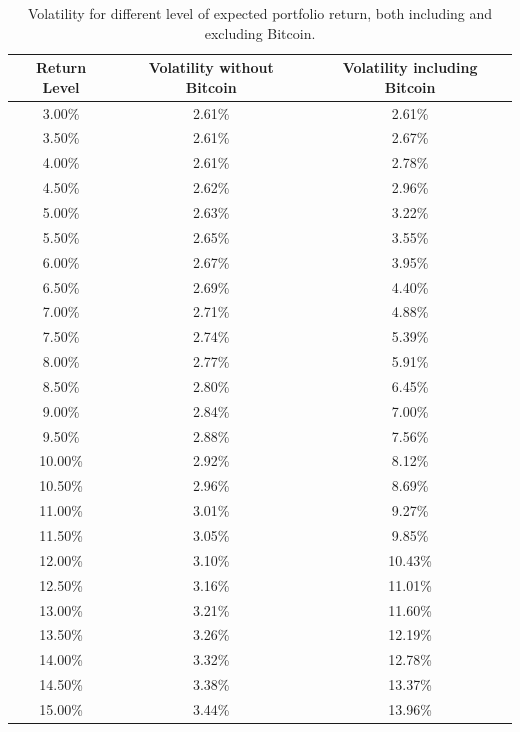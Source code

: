 \begin{table}
	\centering
	\caption[Markowitz efficient frontier on returns]{Volatility for different level of expected portfolio return, both including and excluding Bitcoin.}
	\label{tab:markowitz_vol_on_ret}
\begin{tabular}{ccc}
	Return Level & Volatility without Bitcoin & Volatility including Bitcoin\\
	\midrule
	3.00\% & 2.61\% & 2.61\% \\
	3.50\% & 2.61\% & 2.67\% \\
	4.00\% & 2.61\% & 2.78\% \\
	4.50\% & 2.62\% & 2.96\% \\
	5.00\% & 2.63\% & 3.22\% \\
	5.50\% & 2.65\% & 3.55\% \\
	6.00\% & 2.67\% & 3.95\% \\
	6.50\% & 2.69\% & 4.40\% \\
	7.00\% & 2.71\% & 4.88\% \\
	7.50\% & 2.74\% & 5.39\% \\
	8.00\% & 2.77\% & 5.91\% \\
	8.50\% & 2.80\% & 6.45\% \\
	9.00\% & 2.84\% & 7.00\% \\
	9.50\% & 2.88\% & 7.56\% \\
	10.00\% & 2.92\% & 8.12\% \\
	10.50\% & 2.96\% & 8.69\% \\
	11.00\% & 3.01\% & 9.27\% \\
	11.50\% & 3.05\% & 9.85\% \\
	12.00\% & 3.10\% & 10.43\% \\
	12.50\% & 3.16\% & 11.01\% \\
	13.00\% & 3.21\% & 11.60\% \\
	13.50\% & 3.26\% & 12.19\% \\
	14.00\% & 3.32\% & 12.78\% \\
	14.50\% & 3.38\% & 13.37\% \\
	15.00\% & 3.44\% & 13.96\% \\
	\midrule
\end{tabular}

\end{table}


